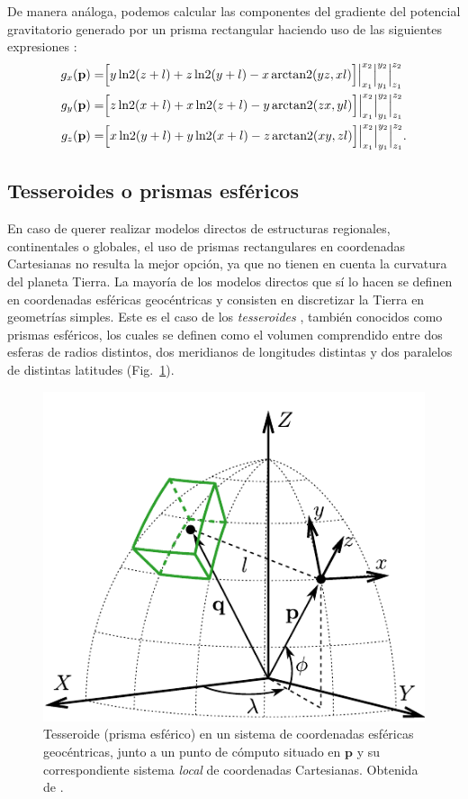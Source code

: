 De manera análoga, podemos calcular las componentes del gradiente del potencial
gravitatorio generado por un prisma rectangular haciendo uso de las siguientes
expresiones \citep{nagy2000,nagy2002}:
%
\begin{align}
    g_x(\mathbf{p}) =&
        \Big[
            y \operatorname{ln2}(z + l) + z \operatorname{ln2}(y + l)  - x \operatorname{arctan2}(yz, xl)
        \Big]
        \Big|_{x_1}^{x_2}
        \Big|_{y_1}^{y_2}
        \Big|_{z_1}^{z_2} \\
    g_y(\mathbf{p}) =&
        \Big[
            z \operatorname{ln2}(x + l) + x \operatorname{ln2}(z + l)  - y \operatorname{arctan2}(zx, yl)
        \Big]
        \Big|_{x_1}^{x_2}
        \Big|_{y_1}^{y_2}
        \Big|_{z_1}^{z_2} \\
    g_z(\mathbf{p}) =&
        \Big[
            x \operatorname{ln2}(y + l) + y \operatorname{ln2}(x + l) - z \operatorname{arctan2}(xy, zl)
        \Big]
        \Big|_{x_1}^{x_2}
        \Big|_{y_1}^{y_2}
        \Big|_{z_1}^{z_2}.
\end{align}


\subsection{Tesseroides o prismas esféricos}

En caso de querer realizar modelos directos de estructuras regionales,
continentales o globales, el uso de prismas rectangulares en coordenadas
Cartesianas no resulta la mejor opción, ya que no tienen en cuenta la curvatura
del planeta Tierra.
La mayoría de los modelos directos que sí lo hacen se definen en coordenadas
esféricas geocéntricas y consisten en discretizar la Tierra en geometrías
simples.
Este es el caso de los \emph{tesseroides} \citep{anderson1976}, también
conocidos como prismas esféricos, los cuales se definen como el volumen
comprendido entre dos esferas de radios distintos, dos meridianos de longitudes
distintas y dos paralelos de distintas latitudes (Fig.~\ref{fig:tesseroid}).

\begin{figure}
    \centering
    \includegraphics[width=0.7\linewidth]{figs/tesseroid-coord-sys.pdf}
    \caption{
        Tesseroide (prisma esférico) en un sistema de coordenadas esféricas
        geocéntricas, junto a un punto de cómputo situado en $\mathbf{p}$ y su
        correspondiente sistema \emph{local} de coordenadas Cartesianas.
        Obtenida de \citet{uieda2015}.
    }
    \label{fig:tesseroid}
\end{figure}

